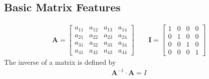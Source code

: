\documentclass[letterpaper,10pt,english]{sphinxmanual}
\begin{document}
\subsection{Basic Matrix Features}
\label{\detokenize{chapter3:basic-matrix-features}}
\begin{equation*}
\begin{split}
\mathbf{A} =
      \begin{bmatrix} a_{11} & a_{12} & a_{13} & a_{14} \\
                                 a_{21} & a_{22} & a_{23} & a_{24} \\
                                   a_{31} & a_{32} & a_{33} & a_{34} \\
                                  a_{41} & a_{42} & a_{43} & a_{44}
             \end{bmatrix}\qquad
\mathbf{I} =
      \begin{bmatrix} 1 & 0 & 0 & 0 \\
                                 0 & 1 & 0 & 0 \\
                                 0 & 0 & 1 & 0 \\
                                 0 & 0 & 0 & 1
             \end{bmatrix}
\end{split}
\end{equation*}
The inverse of a matrix is defined by
\begin{equation*}
\begin{split}
\mathbf{A}^{-1} \cdot \mathbf{A} = I
\end{split}
\end{equation*}
\end{document}
